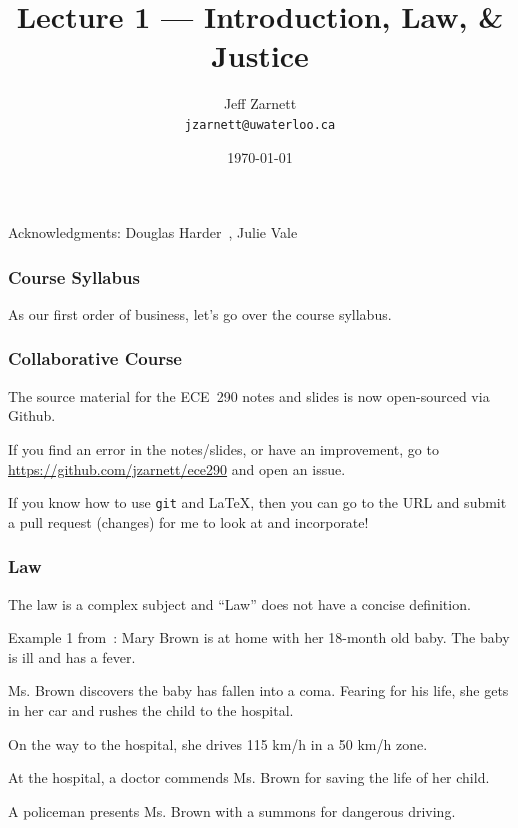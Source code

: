 

\title{Lecture 1 --- Introduction, Law, \& Justice}

\author{Jeff Zarnett \\ \small \texttt{jzarnett@uwaterloo.ca}}
\date{\today}




\begin{frame}
  \titlepage

\begin{center}
  \small{Acknowledgments: Douglas Harder~\cite{dwh}, Julie Vale~\cite{jv}}
  \end{center}
\end{frame}


\begin{frame}
\frametitle{Course Syllabus}

As our first order of business, let's go over the course syllabus.

\end{frame}

\begin{frame}
\frametitle{Collaborative Course}

The source material for the ECE~290 notes and slides is now open-sourced via Github. 

If you find an error in the notes/slides, or have an improvement, go to \url{https://github.com/jzarnett/ece290} and open an issue. 

If you know how to use \texttt{git} and \LaTeX, then you can go to the URL and submit a pull request (changes) for me to look at and incorporate!


\end{frame}



\begin{frame}
\frametitle{Law}

The law is a complex subject and ``Law'' does not have a concise definition.

Example 1 from~\cite{lba}: Mary Brown is at home with her 18-month old baby. The baby is ill and has a fever.

Ms. Brown discovers the baby has fallen into a coma. Fearing for his life, she gets in her car and rushes the child to the hospital.

On the way to the hospital, she drives 115 km/h in a 50 km/h zone. 

At the hospital, a doctor commends Ms. Brown for saving the life of her child.

A policeman presents Ms. Brown with a summons for dangerous driving.

\end{frame}



